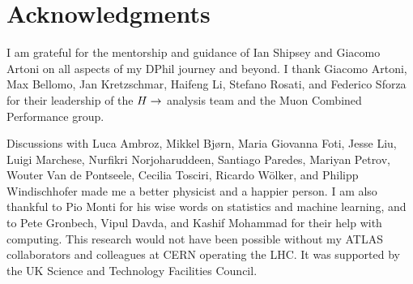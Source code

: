 \chapter*{Acknowledgments}

I am grateful for the mentorship and guidance of Ian Shipsey and Giacomo Artoni
on all aspects of my DPhil journey and beyond. I thank Giacomo Artoni, Max Bellomo,
Jan Kretzschmar, Haifeng Li, Stefano Rosati, and Federico Sforza for their leadership
of the $H \rightarrow$ analysis team and the Muon Combined Performance group.

Discussions with Luca Ambroz, Mikkel Bj{\o}rn, Maria Giovanna Foti, Jesse Liu, Luigi Marchese,
Nurfikri Norjoharuddeen, Santiago Paredes, Mariyan Petrov, Wouter Van de Pontseele,
Cecilia Tosciri, Ricardo W\"olker, and Philipp Windischhofer made me a better physicist
and a happier person. I am also thankful to Pio Monti for his wise words on statistics
and machine learning, and to Pete Gronbech, Vipul Davda, and Kashif Mohammad for their
help with computing. This research would not have been possible without my ATLAS collaborators
and colleagues at CERN operating the LHC. It was supported by the UK Science and
Technology Facilities Council.


